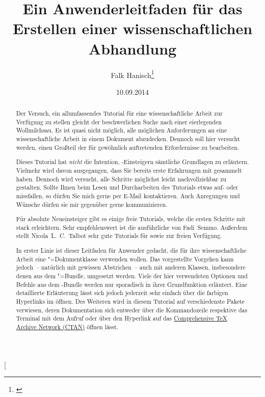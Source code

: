 \documentclass[%
  english,ngerman,%
  geometry=no,DIV=12,automark,%
]{tudscrartcl}
\begin{document}
\title{%
  Ein Anwenderleitfaden für das Erstellen einer wissenschaftlichen Abhandlung%
}
\author{Falk Hanisch\thanks{\noexpand\href{mailto:\tudscrmail}{\tudscrmail}}}
\date{10.09.2014}
\makeatletter
\begingroup%
  \def\and{, }%
  \let\thanks\@gobble%
  \let\footnote\@gobble%
\endgroup%
\makeatother
\StartTutorial[%
  \begin{abstract}\noindent
  Der Versuch, ein allumfassendes Tutorial für eine wissenschaftliche Arbeit 
  zur Verfügung zu stellen gleicht der beschwerlichen Suche nach einer 
  eierlegenden Wollmilchsau. Es ist quasi nicht möglich, alle möglichen 
  Anforderungen an eine wissenschaftliche Arbeit in einem Dokument abzudecken. 
  Dennoch soll hier versucht werden, einen Großteil der für gewöhnlich 
  auftretenden Erfordernisse zu bearbeiten.
  
  Dieses Tutorial hat \emph{nicht} die Intention, -Einsteigern 
  sämtliche Grundlagen zu erläutern. Vielmehr wird davon ausgegangen, dass Sie 
  bereits erste Erfahrungen mit  gesammelt haben. Dennoch wird 
  versucht, alle Schritte möglichst leicht nachvollziehbar zu gestalten. Sollte 
  Ihnen beim Lesen und Durcharbeiten des Tutorials etwas auf- oder missfallen, 
  so dürfen Sie mich gerne per E-Mail kontaktieren. Auch Anregungen und Wünsche 
  dürfen sie mir gegenüber gerne kommunizieren.
  
  Für absolute Neueinsteiger gibt es einige freie Tutorials, welche die ersten 
  Schritte mit  stark erleichtern. Sehr empfehlenswert ist die 
  ausführliche  
  von Fadi~Semmo. Außerdem stellt Nicola~L.~C.~Talbot sehr gute Tutorials für 
  sowie  zur 
  freien Verfügung.
  
  In erster Linie ist dieser Leitfaden für Anwender gedacht, die für ihre
  wissenschaftliche Arbeit eine \TUDScript"=Dokumentklasse verwenden wollen. 
  Das vorgestellte Vorgehen kann jedoch~-- natürlich mit gewissen Abstrichen~-- 
  auch mit anderen Klassen, insbesondere denen aus dem \KOMAScript"=Bundle, 
  umgesetzt werden. Viele der hier verwendeten Optionen und Befehle aus dem 
  \TUDScript-Bundle werden nur sporadisch in ihrer Grundfunktion erläutert. 
  Eine detaillierte Erläuterung lässt sich jedoch jederzeit sehr einfach über 
  die farbigen Hyperlinks im  öffnen. Des 
  Weiteren wird in diesem Tutorial auf verschiedenste Pakete verwiesen, deren 
  Dokumentation sich entweder über die Kommandozeile respektive das Terminal 
  mit dem Aufruf  oder über den Hyperlink auf das 
  \href{http://www.ctan.org/}{Comprehensive TeX Archive Network (CTAN)} öffnen 
  lässt.
  

\end{abstract}
\end{document}
